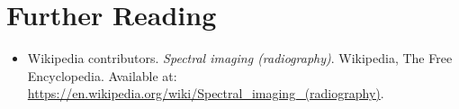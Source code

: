 \section{Further Reading}
\begin{itemize}
  \item Wikipedia contributors. \textit{Spectral imaging (radiography)}. Wikipedia, The Free Encyclopedia. Available at: \url{https://en.wikipedia.org/wiki/Spectral_imaging_(radiography)}.
\end{itemize}
